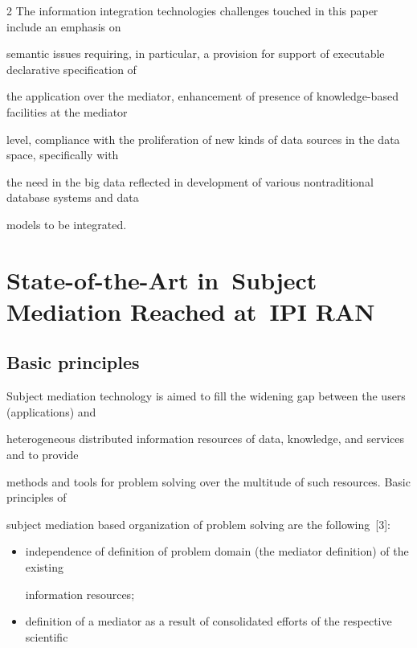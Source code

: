 \begin{multicols}{2}
The information integration technologies challenges touched in this paper include an emphasis on 


semantic issues requiring, in particular, a provision for support of executable declarative specification of 


the application over the mediator, enhancement of presence of knowledge-based facilities at the mediator 


level, compliance with the proliferation of new kinds of data sources in the data space, specifically with 


the need in the big data reflected in development of various nontraditional database systems and data 


models to be integrated.





\section{State-of-the-Art in~Subject Mediation Reached at~IPI RAN}





\subsection{Basic principles}





\noindent


Subject mediation technology is aimed to fill the widening gap between the users (applications) and 


heterogeneous distributed information resources of data, knowledge, and services and to provide 


methods and tools for problem solving over the multitude of such resources. Basic principles of 


subject mediation based organization of problem solving are the following~[3]:


\begin{itemize}


\item independence of definition of problem domain (the mediator definition) of the existing 


information resources;\\[-9pt]


\item definition of a mediator as a result of consolidated efforts of the respective scientific 



\end{itemize}
\end{multicols}
